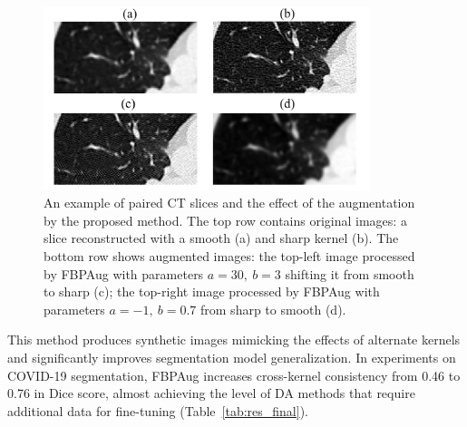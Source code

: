 \begin{figure}[h]
	\centering
	\includegraphics[width=0.85\textwidth]{Dissertation/Figures/3_ct/4crops.png}%
	\caption{An example of paired CT slices and the effect of the augmentation by the proposed method.  The top row contains original images: a slice reconstructed with a smooth (a) and sharp kernel (b). The bottom row shows augmented images: the top-left image processed by FBPAug with parameters $a=30,~b=3$ shifting it from smooth to sharp (c); the top-right image processed by FBPAug with parameters $a=-1,~b=0.7$ from sharp to smooth (d).}
	\label{fig:crops}
\end{figure}

This method produces synthetic images mimicking the effects of alternate kernels and significantly improves segmentation model generalization. In experiments on COVID-19 segmentation, FBPAug increases cross-kernel consistency from 0.46 to 0.76 in Dice score, almost achieving the level of DA methods that require additional data for fine-tuning (Table~\ref{tab:res_final}).


